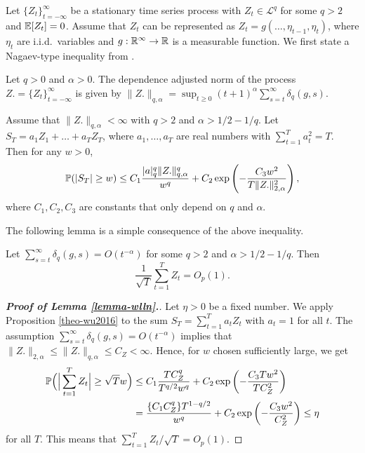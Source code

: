 \documentclass[12pt]{article}
\begin{document}
Let $\{Z_t\}_{t=-\infty}^\infty$ be a stationary time series process with $Z_t \in \mathcal{L}^q$ for some $q > 2$ and $\mathbb{E}[Z_t] = 0$. Assume that $Z_t$ can be represented as $Z_t = g(\ldots, \eta_{t-1}, \eta_t)$, where $\eta_t$ are i.i.d.\ variables and $g: \mathbb{R}^\infty \to \mathbb{R}$ is a measurable function. We first state a Nagaev-type inequality from \cite{Wu2016}. 


\begin{definitionA}\label{defA-DAN} 
Let $q > 0$ and $\alpha > 0$. The dependence adjusted norm of the process $Z. = \{Z_t\}_{t=-\infty}^\infty$ is given by 
$\|Z.\|_{q, \alpha} = \sup_{t\geq 0} (t+1)^{\alpha} \sum_{s=t}^{\infty} \delta_{q}(g,s)$.
\end{definitionA}


\begin{propA}\label{theo-wu2016}
Assume that $\|Z.\|_{q, \alpha} < \infty$ with $q > 2$ and $\alpha > 1/2 - 1/q$. Let $S_T = a_1 Z_1 + \ldots + a_T Z_T$, where $a_1,\ldots,a_T$ are real numbers with $\sum_{t=1}^T a_t^2 = T$. Then for any $w>0$,
\[ \mathbb{P}(|S_T| \geq w) \leq C_1 \frac{|a|_{q}^{q}\|Z.\|^{q}_{q, \alpha}}{w^{q}} + C_2 \exp \left( - \frac{C_3 w^2} {T \|Z.\|^2_{2, \alpha}}\right), \]
where $C_1, C_2, C_3$ are constants that only depend on $q$ and $\alpha$.
\end{propA}


The following lemma is a simple consequence of the above inequality. 


\begin{lemmaA}\label{lemma-wlln}
Let $\sum_{s=t}^\infty \delta_{q}(g,s) = O(t^{-\alpha})$ for some $q > 2$ and $\alpha > 1/2 - 1/q$. Then 
\[ \frac{1}{\sqrt{T}} \sum_{t=1}^T Z_t = O_p(1). \]
\end{lemmaA} 


\begin{proof}[\textnormal{\textbf{Proof of Lemma \ref{lemma-wlln}.}}]
Let $\eta > 0$ be a fixed number. We apply Proposition \ref{theo-wu2016} to the sum $S_T = \sum_{t=1}^T a_t Z_t$ with $a_t = 1$ for all $t$. The assumption $\sum_{s=t}^\infty \delta_{q}(g,s) = O(t^{-\alpha})$ implies that $\|Z.\|_{2, \alpha} \le \|Z.\|_{q, \alpha} \le C_Z < \infty$. Hence, for $w$ chosen sufficiently large, we get 
\begin{align*}
\mathbb{P}\Big( \Big| \sum_{t=1}^T Z_t \Big| \geq \sqrt{T} w\Big) 
 & \leq C_1 \frac{T C_Z^q}{T^{q/2} w^q} + C_2 \exp \left( - \frac{C_3 T w^2} {T C_Z^2}\right) \\
 & = \frac{\{C_1 C_Z^q\} T^{1-q/2}}{w^q} + C_2 \exp \left( - \frac{C_3 w^2} {C_Z^2}\right) \le \eta
\end{align*}
for all $T$. This means that $\sum_{t=1}^T Z_t / \sqrt{T} = O_p(1)$. 
\end{proof}
\end{document}
